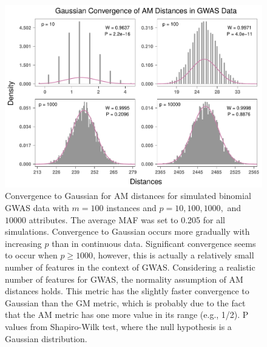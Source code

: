 \documentclass[10pt,letterpaper]{article}\usepackage[]{graphicx}\usepackage[]{color}
\begin{document}
\begin{figure}[H]
	\includegraphics[width=\textwidth]{central_limit_hist_gwas_AM.pdf}
	\caption{Convergence to Gaussian for AM distances for simulated binomial GWAS data with $m=100$ instances and $p=10, 100, 1000,$ and $10000$ attributes. The average MAF was set to 0.205 for all simulations. Convergence to Gaussian occurs more gradually with increasing $p$ than in continuous data. Significant convergence seems to occur when $p \geq 1000$, however, this is actually a relatively small number of features in the context of GWAS. Considering a realistic number of features for GWAS, the normality assumption of AM distances holds. This metric has the slightly faster convergence to Gaussian than the GM metric, which is probably due to the fact that the AM metric has one more value in its range (e.g., 1/2). P values from Shapiro-Wilk test, where the null hypothesis is a Gaussian distribution.}
\end{figure}
\end{document}
